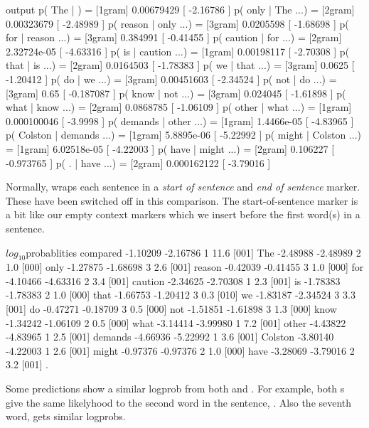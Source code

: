 \documentclass[a4paper,10pt,twoside]{report}
\begin{document}
\begin{wout}{\srilm{} output}
        p( The |  )               = [1gram] 0.00679429 [ -2.16786 ]
        p( only | The ...)        = [2gram] 0.00323679 [ -2.48989 ]
        p( reason | only ...)     = [3gram] 0.0205598 [ -1.68698 ]
        p( for | reason ...)      = [3gram] 0.384991 [ -0.41455 ]
        p( caution | for ...)     = [2gram] 2.32724e-05 [ -4.63316 ]
        p( is | caution ...)      = [1gram] 0.00198117 [ -2.70308 ]
        p( that | is ...)         = [2gram] 0.0164503 [ -1.78383 ]
        p( we | that ...)         = [3gram] 0.0625 [ -1.20412 ]
        p( do | we ...)           = [3gram] 0.00451603 [ -2.34524 ]
        p( not | do ...)          = [3gram] 0.65 [ -0.187087 ]
        p( know | not ...)        = [3gram] 0.024045 [ -1.61898 ]
        p( what | know ...)       = [2gram] 0.0868785 [ -1.06109 ]
        p( other | what ...)      = [1gram] 0.000100046 [ -3.9998 ]
        p( demands | other ...)   = [1gram] 1.4466e-05 [ -4.83965 ]
        p( Colston | demands ...) = [1gram] 5.8895e-06 [ -5.22992 ]
        p( might | Colston ...)   = [1gram] 6.02518e-05 [ -4.22003 ]
        p( have | might ...)      = [2gram] 0.106227 [ -0.973765 ]
        p( . | have ...)          = [2gram] 0.000162122 [ -3.79016 ]
\end{wout}

Normally, \srilm{} wraps each sentence in a \emph{start of sentence}
and \emph{end of sentence} marker. These have been switched off in
this comparison. The start-of-sentence marker is a bit like
our empty context markers which we insert before the first word(s) in
a sentence. 

\begin{wout}{$log_{10}$probablities compared}
-1.10209 -2.16786 1   11.6 [001] The
-2.48988 -2.48989 2    1.0 [000] only
-1.27875 -1.68698 3    2.6 [001] reason
-0.42039 -0.41455 3    1.0 [000] for
-4.10466 -4.63316 2    3.4 [001] caution
-2.34625 -2.70308 1    2.3 [001] is
-1.78383 -1.78383 2    1.0 [000] that
-1.66753 -1.20412 3    0.3 [010] we
-1.83187 -2.34524 3    3.3 [001] do
-0.47271 -0.18709 3    0.5 [000] not
-1.51851 -1.61898 3    1.3 [000] know
-1.34242 -1.06109 2    0.5 [000] what
-3.14414 -3.99980 1    7.2 [001] other
-4.43822 -4.83965 1    2.5 [001] demands
-4.66936 -5.22992 1    3.6 [001] Colston
-3.80140 -4.22003 1    2.6 [001] might
-0.97376 -0.97376 2    1.0 [000] have
-3.28069 -3.79016 2    3.2 [001] .
\end{wout}

Some predictions show a similar logprob from both \wopr{} and
\srilm{}. For example, both \lm{}s give the same likelyhood to the
second word in the sentence, . Also the seventh word,
 gets similar logprobs. 
\end{document}
